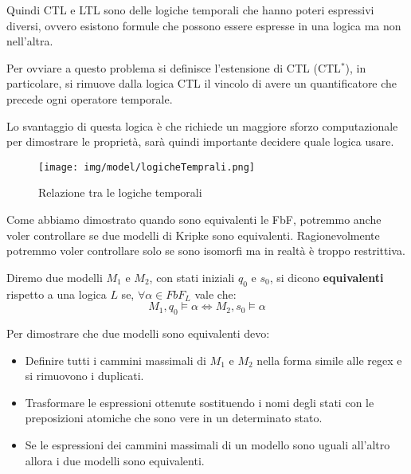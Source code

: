 Quindi CTL e LTL sono delle logiche temporali che hanno poteri espressivi diversi,
ovvero esistono formule che possono essere espresse in una logica ma non nell'altra.

Per ovviare a questo problema si definisce l'estensione di CTL (CTL$^\ast$),
in particolare, si rimuove dalla logica CTL il vincolo di avere un quantificatore
che precede ogni operatore temporale.

Lo svantaggio di questa logica è che richiede un maggiore sforzo computazionale
per dimostrare le proprietà, sarà quindi importante decidere quale logica usare.
\begin{figure}[!ht]
    \centering
    \texttt{[image: img/model/logicheTemprali.png]}
    \caption{Relazione tra le logiche temporali}
\end{figure}
Come abbiamo dimostrato quando sono equivalenti le FbF, potremmo anche voler
controllare se due modelli di Kripke sono equivalenti. Ragionevolmente potremmo
voler controllare solo se sono isomorfi ma in realtà è troppo restrittiva.
\begin{definizione}
    Diremo due modelli $M_1$ e $M_2$, con stati iniziali $q_0$ e $s_0$, si dicono
    \textbf{equivalenti} rispetto a una logica $L$ se, $\forall \alpha \in FbF_L$
    vale che:
    \begin{equation}
        M_1, q_0 \models \alpha \iff M_2, s_0 \models \alpha
    \end{equation}
\end{definizione}
Per dimostrare che due modelli sono equivalenti devo:
\begin{itemize}
    \item Definire tutti i cammini massimali di $M_1$ e $M_2$ nella forma simile
          alle regex e si rimuovono i duplicati.
    \item Trasformare le espressioni ottenute sostituendo i nomi degli stati con
          le preposizioni atomiche che sono vere in un determinato stato.
    \item Se le espressioni dei cammini massimali di un modello sono uguali
          all'altro allora i due modelli sono equivalenti.
\end{itemize}
